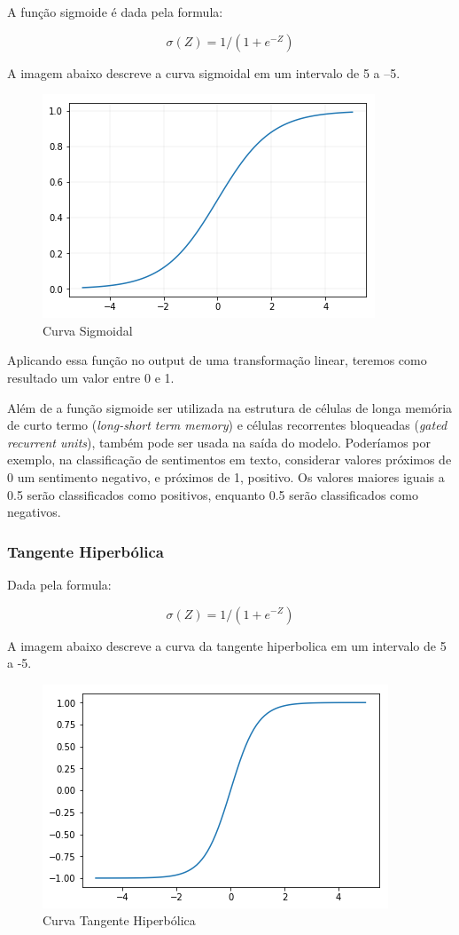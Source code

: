 \documentclass[12pt]{article}
\begin{document}
A função sigmoide é dada pela formula:

\begin{equation}
    \sigma(Z) = 1/(1+e^{-Z})
\end{equation}

A imagem abaixo descreve a curva sigmoidal em um intervalo de 5 a –5.

\begin{figure}[ht]
\centering
\includegraphics[width=.5\textwidth]{images/sigmoid.png}
\caption{Curva Sigmoidal}
\label{fig:sigmoid}
\end{figure}

Aplicando essa função no output de uma transformação linear, teremos como resultado um valor entre 0 e 1.

Além de a função sigmoide ser utilizada na estrutura de células de longa memória de curto termo (\textit{long-short term memory}) e células recorrentes bloqueadas (\textit{gated recurrent units}), também pode ser usada na saída do modelo. Poderíamos por exemplo, na classificação de sentimentos em texto, considerar valores próximos de 0 um sentimento negativo, e próximos de 1, positivo. Os valores maiores iguais a 0.5 serão classificados como positivos, enquanto 0.5 serão classificados como negativos.

\subsubsection{Tangente Hiperbólica}

Dada pela formula: 

\begin{equation}
    \sigma(Z) = 1/(1+e^{-Z})
\end{equation}

A imagem abaixo descreve a curva da tangente hiperbolica em um intervalo de 5 a -5.

\begin{figure}[ht]
\centering
\includegraphics[width=.5\textwidth]{images/tanh.png}
\caption{Curva Tangente Hiperbólica}
\label{fig:tanh}
\end{figure}
\end{document}
